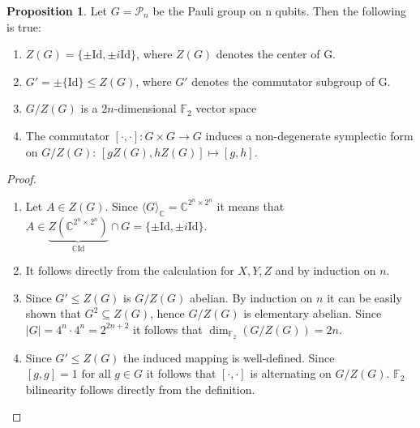 \documentclass[12pt,a4paper,BCOR15mm,twoside,DIV12]{article}
\def\P{\mathcal{P}}
\def\N{\mathbb{N}}
\def\F{\mathbb{F}}
\def\C{\mathbb{C}}
\def\fa{\text{ for all }}
\def\Id{\text{Id}}
\theoremstyle{definition}
\newtheorem{theorem}[Satz]{Theorem}
\newtheorem{prop}[Satz]{Proposition}
\begin{document}

\begin{prop} Let $G = \P_n$ be the Pauli group on n qubits. Then the following is true:
\begin{enumerate}
\item $Z(G) = \{ \pm \Id, \pm i \Id \}$, where $Z(G)$ denotes the center of G.
\item $G' = \pm \{ \Id \} \leq Z(G)$, where $G'$ denotes the commutator subgroup of G.
\item $G/Z(G)$ is a $2n$-dimensional $\F_2$ vector space
\item The commutator $[\cdot,\cdot] : G \times G \rightarrow G$ induces a non-degenerate symplectic form on $G/Z(G)$: $[gZ(G),hZ(G)] \mapsto [g,h]$. 
\end{enumerate}

\begin{proof}\label{pauliprops}
\begin{enumerate}
\item Let $A \in Z(G)$. Since $\langle G \rangle_\C = \C^{2^n \times 2^n}$ it means that $A \in \underbrace{Z(\C^{2^n \times 2^n})}_{ \C \Id} \cap G = \{ \pm \Id, \pm i \Id \}$.
\item It follows directly from the calculation for $X,Y,Z$ and by induction on $n$.
\item Since $G' \leq Z(G)$ is $G/Z(G)$ abelian. By induction on $n$ it can be easily shown that $G^2 \subseteq Z(G)$, hence $G/Z(G)$ is elementary abelian. Since $|G| = 4^n \cdot 4^n = 2^{2n+2}$ it follows that $\dim_{\F_2}(G/Z(G)) = 2n$.
\item Since $G' \leq Z(G)$ the induced mapping is well-defined. Since $[g,g] = 1 \fa g \in G$ it follows that $[\cdot,\cdot]$ is alternating on $G/Z(G)$. $\F_2$ bilinearity follows directly from the definition.
\end{enumerate}
\end{proof}
\end{prop}
\end{document}
